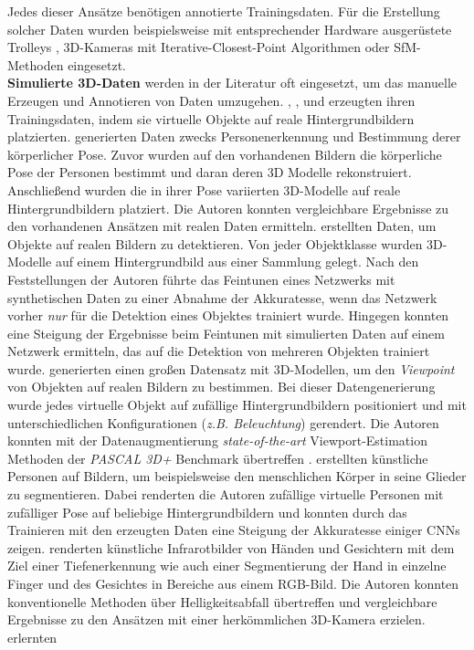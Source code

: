 Jedes dieser Ansätze benötigen annotierte Trainingsdaten. Für die Erstellung solcher Daten wurden beispielsweise mit entsprechender Hardware ausgerüstete Trolleys \cite{huitlTUMindoorExtensiveImage2012}, 3D-Kameras mit Iterative-Closest-Point Algorithmen \cite{izadiKinectFusionRealtime3D2011} oder SfM-Methoden \cite{kendallPoseNetConvolutionalNetwork2015} eingesetzt.
\\
\textbf{Simulierte 3D-Daten} werden in der Literatur oft eingesetzt, um das manuelle Erzeugen und Annotieren von Daten umzugehen. \citet{pishchulinArticulatedPeopleDetection2012a}, \citet{pengLearningDeepObject2015}, \citet{suRenderCNNViewpoint2015} und \citet{varolLearningSyntheticHumans2017} erzeugten ihren Trainingsdaten, indem sie virtuelle Objekte auf reale Hintergrundbildern platzierten. \citet{pishchulinArticulatedPeopleDetection2012a} generierten Daten zwecks Personenerkennung und Bestimmung derer körperlicher Pose. Zuvor wurden auf den vorhandenen Bildern die körperliche Pose der Personen bestimmt und daran deren 3D Modelle rekonstruiert. Anschließend wurden die in ihrer Pose variierten 3D-Modelle auf reale Hintergrundbildern platziert. Die Autoren konnten vergleichbare Ergebnisse zu den vorhandenen Ansätzen mit realen Daten ermitteln. \citet{pengLearningDeepObject2015} erstellten Daten, um Objekte auf realen Bildern zu detektieren. Von jeder Objektklasse wurden 3D-Modelle auf einem Hintergrundbild aus einer Sammlung gelegt. Nach den Feststellungen der Autoren führte das Feintunen eines Netzwerks mit synthetischen Daten zu einer Abnahme der Akkuratesse, wenn das Netzwerk vorher \textit{nur} für die Detektion eines Objektes trainiert wurde. Hingegen konnten \citet{pengLearningDeepObject2015} eine Steigung der Ergebnisse beim Feintunen mit simulierten Daten auf einem Netzwerk ermitteln, das auf die Detektion von mehreren Objekten trainiert wurde. \citet{suRenderCNNViewpoint2015} generierten einen großen Datensatz mit 3D-Modellen, um den \textit{Viewpoint} von Objekten auf realen Bildern zu bestimmen. Bei dieser Datengenerierung wurde jedes virtuelle Objekt auf zufällige Hintergrundbildern positioniert und mit unterschiedlichen Konfigurationen (\textit{z.B. Beleuchtung}) gerendert. Die Autoren konnten mit der Datenaugmentierung \textit{state-of-the-art} Viewport-Estimation Methoden der \textit{PASCAL 3D+}\cite{xiangPASCALBenchmark3D2014} Benchmark übertreffen \cite{suRenderCNNViewpoint2015}. \citet{varolLearningSyntheticHumans2017} erstellten künstliche Personen auf Bildern, um beispielsweise den menschlichen Körper in seine Glieder zu segmentieren. Dabei renderten die Autoren zufällige virtuelle Personen mit zufälliger Pose auf beliebige Hintergrundbildern und konnten durch das Trainieren mit den erzeugten Daten eine Steigung der Akkuratesse einiger CNNs zeigen. \citet{fanelloLearningBeDepth2014} renderten künstliche Infrarotbilder von Händen und Gesichtern mit dem Ziel einer Tiefenerkennung wie auch einer Segmentierung der Hand in einzelne Finger und des Gesichtes in Bereiche aus einem RGB-Bild. Die Autoren konnten konventionelle Methoden über Helligkeitsabfall übertreffen und vergleichbare Ergebnisse zu den Ansätzen mit einer herkömmlichen 3D-Kamera erzielen. \citet{dosovitskiyFlowNetLearningOptical2015} erlernten 